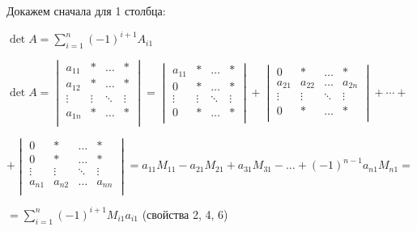 \begin{enumerate}
          Докажем сначала для 1 столбца:

          \(\det A = \sum\limits_{i = 1}^n (-1)^{i+1} A_{i1}\)

          \(\det A =
          \begin{vmatrix}
              a_{11} & *      & \ldots & *      \\
              a_{12} & *      & \ldots & *      \\
              \vdots & \vdots & \ddots & \vdots \\
              a_{1n} & *      & \ldots & *      \\
          \end{vmatrix} =
          \begin{vmatrix}
              a_{11} & *      & \ldots & *      \\
              0      & *      & \ldots & *      \\
              \vdots & \vdots & \ddots & \vdots \\
              0      & *      & \ldots & *      \\
          \end{vmatrix} +
          \begin{vmatrix}
              0      & *      & \ldots & *      \\
              a_{21} & a_{22} & \ldots & a_{2n} \\
              \vdots & \vdots & \ddots & \vdots \\
              0      & *      & \ldots & *      \\
          \end{vmatrix} + \cdots +\)

          \(+
          \begin{vmatrix}
              0      & *      & \ldots & *      \\
              0      & *      & \ldots & *      \\
              \vdots & \vdots & \ddots & \vdots \\
              a_{n1} & a_{n2} & \ldots & a_{nn} \\
          \end{vmatrix} = a_{11} M_{11} - a_{21} M_{21} + a_{31} M_{31} - \ldots + (-1)^{n-1} a_{n1} M_{n1} =\)

          \(= \sum\limits_{i = 1}^n (-1)^{i + 1} M_{i1} a_{i1}\) (свойства 2, 4, 6)



\end{enumerate}
